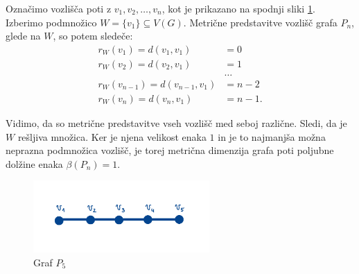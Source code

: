 \documentclass[mat1, tisk]{fmfdelo}
\newcommand{\1}{(1, 1, \ldots, 1)}
\newcommand{\2}{(2, 2, \ldots, 2)}
\begin{document}
\begin{primer} \label{pr:mdim_pot}
Označimo vozlišča poti z $v_1, v_2, \ldots, v_n$, kot je prikazano na spodnji sliki \ref{fig:pot}. 
Izberimo podmnožico $W = \{v_1\} \subseteq V(G).$ Metrične predstavitve vozlišč grafa $P_n$, 
glede na $W$, so potem sledeče:
\begin{align*}
    r_W(v_1) = d(v_1, v_1) & = 0 \\
    r_W(v_2) = d(v_2, v_1) & = 1 \\
    & \dots \\
    r_W(v_{n-1}) = d(v_{n-1}, v_1) & = n-2 \\
    r_W(v_n) = d(v_n, v_1) & = n-1.
\end{align*}

Vidimo, da so metrične predstavitve vseh vozlišč med seboj različne. Sledi, da je $W$ 
rešljiva množica. Ker je njena velikost enaka $1$ in je to najmanjša možna neprazna podmnožica 
vozlišč, je torej metrična dimenzija grafa poti poljubne dolžine enaka $\beta(P_n) = 1.$

\begin{figure}[h]
    \centering
    \includegraphics[width=0.6\textwidth]{IMG_pot.jpg}
    \caption{Graf $P_5$}
    \label{fig:pot}
\end{figure}

\end{primer}
\end{document}
